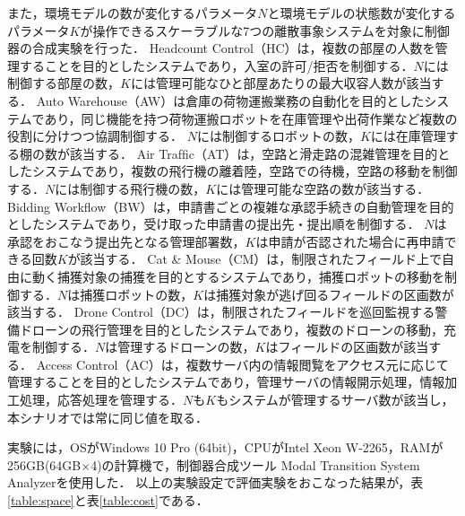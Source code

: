 また，環境モデルの数が変化するパラメータ$N$と環境モデルの状態数が変化するパラメータ$K$が操作できるスケーラブルな7つの離散事象システムを対象に制御器の合成実験を行った．
Headcount Control（HC）\cite{paper:ArtGallery}は，複数の部屋の人数を管理することを目的としたシステムであり，入室の許可/拒否を制御する．$N$には制御する部屋の数，$K$には管理可能なひと部屋あたりの最大収容人数が該当する．
Auto Warehouse（AW）\cite{paper:KIVA_System}は倉庫の荷物運搬業務の自動化を目的としたシステムであり，同じ機能を持つ荷物運搬ロボットを在庫管理や出荷作業など複数の役割に分けつつ協調制御する．
$N$には制御するロボットの数，$K$には在庫管理する棚の数が該当する．
Air Trafﬁc（AT）\cite{paper:DES}は，空路と滑走路の混雑管理を目的としたシステムであり，複数の飛行機の離着陸，空路での待機，空路の移動を制御する．$N$には制御する飛行機の数，$K$には管理可能な空路の数が該当する．
Bidding Workflow（BW）\cite{paper:DES}は，申請書ごとの複雑な承認手続きの自動管理を目的としたシステムであり，受け取った申請書の提出先・提出順を制御する．
$N$は承認をおこなう提出先となる管理部署数，$K$は申請が否認された場合に再申請できる回数$K$が該当する．
Cat \& Mouse（CM）\cite{paper:DES}は，制限されたフィールド上で自由に動く捕獲対象の捕獲を目的とするシステムであり，捕獲ロボットの移動を制御する．$N$は捕獲ロボットの数，$K$は捕獲対象が逃げ回るフィールドの区画数が該当する．
Drone Control（DC）\cite{yamauchi:ICCSCE2023}\cite{yamauchi:SESOS2023}は，制限されたフィールドを巡回監視する警備ドローンの飛行管理を目的としたシステムであり，複数のドローンの移動，充電を制御する．$N$は管理するドローンの数，$K$はフィールドの区画数が該当する．
Access Control（AC）\cite{yamauchi:AIKE2020}は，複数サーバ内の情報閲覧をアクセス元に応じて管理することを目的としたシステムであり，管理サーバの情報開示処理，情報加工処理，応答処理を管理する．$N$も$K$もシステムが管理するサーバ数が該当し，本シナリオでは常に同じ値を取る．

実験には，OSがWindows 10 Pro (64bit)，CPUがIntel Xeon W-2265，RAMが256GB(64GB×4)の計算機で，制御器合成ツール Modal Transition System Analyzer\cite{paper:MTSA}を使用した．
以上の実験設定で評価実験をおこなった結果が，表\ref{table:space}と表\ref{table:cost}である．


